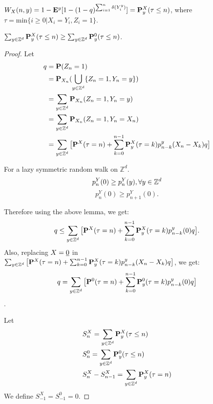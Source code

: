 \documentclass[main]{subfiles}
\begin{document}
\begin{lemma}
    $W_X(n,y)=1-\E^y[1-(1-q)^{\sum_{i=1}^{n}\delta(Y_i^y)}]=\P_y^{X}(\tau\leq n)$, where $\tau=\text{min}\{i\geq 0| X_i=Y_i, Z_i=1\}$.
\end{lemma}


\begin{lemma}
    $\sum_{y\in \mathbb{Z}^d}\P_y^{X}(\tau\leq n)\geq \sum_{y\in \mathbb{Z}^d}\P_y^{0}(\tau\leq n)$.
\end{lemma}
\begin{proof}
    Let \begin{equation*}
        \begin{aligned}
            q & = \P(Z_n=1)                                           \\
              & =\P_{X_n}(\bigcup_{y\in\mathbb{Z}^d}\{Z_n=1, Y_n=y\}) \\
              & = \sum_{y\in\mathbb{Z}^d}\P_{X_n}(Z_n=1, Y_n=y)       \\
              & = \sum_{y\in\mathbb{Z}^d}\P_{X_n}(Z_n=1, Y_n=X_n)     \\
              & =
            \sum_{y\in\mathbb{Z}^d} \big[\P^X(\tau=n)+\sum_{k=0}^{n-1}\P^X_y(\tau=k)p_{n-k}^y(X_n-X_k)q\big]
        \end{aligned}
    \end{equation*}
    \begin{lemma}
        For a lazy symmetric random walk on $\mathbb{Z}^d.$
        $$p_n^Y(0)\geq p_n^Y(y), \forall\hfill y\in \mathbb{Z}^d $$ $$p_n^Y(0)\geq p_{n+1}^Y(0).$$
    \end{lemma}
    Therefore using the above lemma, we get:
    $$q\leq \sum_{y\in\mathbb{Z}^d} \big[\P^X(\tau=n)+\sum_{k=0}^{n-1}\P^X_y(\tau=k)p_{n-k}^y(0)q\big].$$
    Also, replacing $X=\zero$ in $\sum_{y\in\mathbb{Z}^d} \big[\P^X(\tau=n)+\sum_{k=0}^{n-1}\P^X_y(\tau=k)p_{n-k}^y(X_n-X_k)q\big]$, we get:
    $$q=\sum_{y\in\mathbb{Z}^d} \big[\P^0(\tau=n)+\sum_{k=0}^{n-1}\P^0_y(\tau=k)p_{n-k}^y(0)q\big]$$.

    Let \begin{equation*}
        \begin{aligned}
             & S_n^X= \sum_{y\in\mathbb{Z}^d}\P_y^X(\tau\leq n)       \\
             & S_n^0= \sum_{y\in\mathbb{Z}^d}\P_y^0(\tau\leq n)       \\
             & S_n^X-S_{n-1}^X= \sum_{y\in\mathbb{Z}^d}\P_y^X(\tau=n) \\
        \end{aligned}
    \end{equation*}
    We define $S_{-1}^X=S_{-1}^0=0$.


\end{proof}
\end{document}

